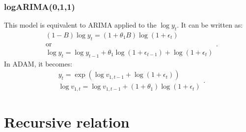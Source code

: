 \documentclass[
]{book}
\theoremstyle{definition}
\theoremstyle{definition}
\theoremstyle{definition}
\theoremstyle{definition}
\theoremstyle{remark}
\begin{document}
\hypertarget{logarima011}{%
\subsubsection{logARIMA(0,1,1)}\label{logarima011}}

This model is equivalent to ARIMA applied to the \(\log y_t\). It can be written as:
\begin{equation*}
    \begin{aligned}
        &(1-B) \log y_t = (1+\theta_1 B) \log(1+\epsilon_t) \\
        &\text{or} \\
        &\log y_{t} = \log y_{t-1} + \theta_1 \log(1+\epsilon_{t-1}) + \log(1+\epsilon_t)
    \end{aligned}.
\end{equation*}
In ADAM, it becomes:
\begin{equation}
  \begin{aligned}
    &{y}_{t} = \exp (\log v_{1,t-1} + \log(1+\epsilon_t)) \\
    &\log v_{1,t} = \log v_{1,t-1} + (1 + \theta_1) \log(1+\epsilon_t)
  \end{aligned}.
  \label{eq:ADAMARIMAExpanded011log}
\end{equation}

\hypertarget{ADAMARIMARecursive}{%
\section{Recursive relation}\label{ADAMARIMARecursive}}
\end{document}

